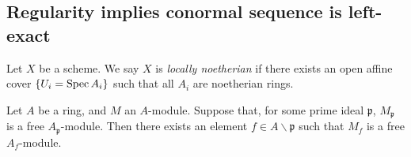 \subsection{Regularity implies conormal sequence is left-exact}

%
%


\begin{definition}
	\label{def:noetherian_scheme}
	Let \(X\) be a scheme. 
	We say \(X\) is \textit{locally noetherian}
	if there exists an open affine cover
	\(\{U_{i} = \operatorname{Spec} A_{i}\}\) such that
	all \(A_{i}\) are noetherian rings.
\end{definition}

\begin{lemma}
	\label{lem:affine_stalk_free_implies_locally_free}
	Let \(A\) be a ring, and \(M\) an \(A\)-module.
	Suppose that, for some prime ideal \(\mathfrak{p}\),
	\(M_{\mathfrak{p}}\) is a free
	\(A_{\mathfrak{p}}\)-module.
	Then there exists an element 
	\(f \in A \smallsetminus \mathfrak{p}\)
	such that 
	\(M_{f}\) is a free \(A_{f}\)-module.
\end{lemma}

